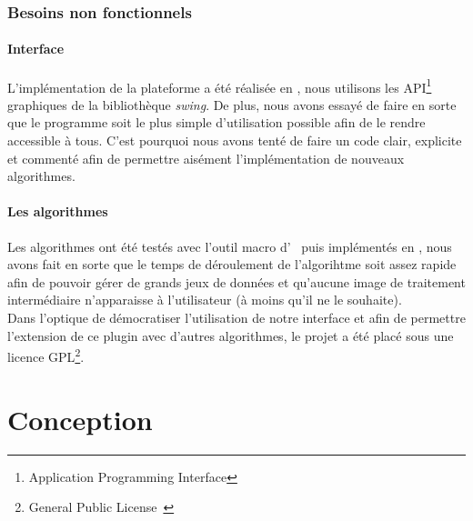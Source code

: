 \documentclass[11pt,a4paper]{report}
\begin{document}
\subsection{Besoins non fonctionnels}
\subsubsection{Interface}
\noindent
L'implémentation de la plateforme a été réalisée en \java, nous utilisons les API\footnote{Application Programming Interface} graphiques de la bibliothèque \emph{swing}. De plus, nous avons essayé de faire en sorte que le programme soit le plus simple d'utilisation possible afin de le rendre accessible à tous. C'est pourquoi nous avons tenté de faire un code clair, explicite et commenté afin de permettre aisément l'implémentation de nouveaux algorithmes.

\subsubsection{Les algorithmes}
\noindent
Les algorithmes ont été testés avec l'outil macro d' \imj ~puis implémentés en \java, nous avons fait en sorte que le temps de déroulement de l'algorihtme soit assez rapide  afin de pouvoir gérer de grands jeux de données et qu'aucune image de traitement intermédiaire n'apparaisse à l'utilisateur (à moins qu'il ne le souhaite).\\

Dans l'optique de démocratiser l'utilisation de notre interface et afin de permettre l'extension de ce plugin avec d'autres algorithmes, le projet a été placé sous une licence GPL\footnote{General Public License~\cite{GPL:url}}.

\noindent

\chapter{Conception}
\end{document}
